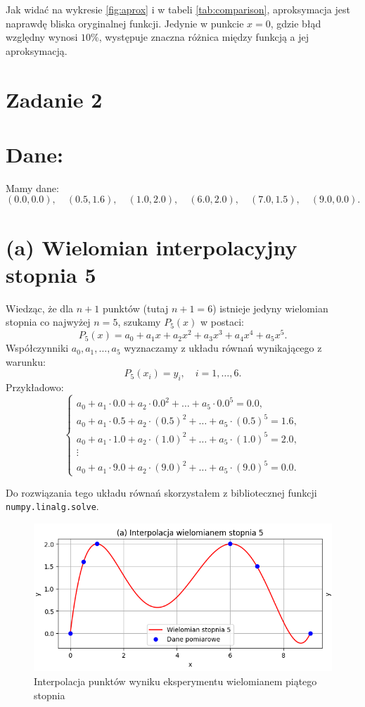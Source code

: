 \documentclass{article}
\begin{document}
Jak widać na wykresie \ref{fig:aprox} i w tabeli \ref{tab:comparison}, aproksymacja jest naprawdę bliska oryginalnej funkcji. Jedynie w punkcie $x = 0$, gdzie błąd względny wynosi $10 \%$, występuje znaczna różnica między funkcją a jej aproksymacją.

\section*{Zadanie 2}
\section*{Dane:}
Mamy dane: 
\[
(0.0,0.0),\quad (0.5,1.6),\quad (1.0,2.0),\quad (6.0,2.0),\quad (7.0,1.5),\quad (9.0,0.0).
\]

\section*{(a) Wielomian interpolacyjny stopnia 5}
Wiedząc, że dla \( n+1 \) punktów (tutaj \( n+1 = 6 \)) istnieje jedyny wielomian stopnia co najwyżej \( n=5 \), szukamy \( P_5(x) \) w postaci:
\[
P_5(x) = a_0 + a_1 x + a_2 x^2 + a_3 x^3 + a_4 x^4 + a_5 x^5.
\]
Współczynniki \( a_0, a_1, \ldots, a_5 \) wyznaczamy z układu równań wynikającego z warunku:
\[
P_5(x_i) = y_i,\quad i=1,\ldots,6.
\]
Przykładowo:
\[
\begin{cases}
a_0 + a_1\cdot 0.0 + a_2\cdot 0.0^2 + \dots + a_5\cdot 0.0^5 = 0.0,\\[1mm]
a_0 + a_1\cdot 0.5 + a_2\cdot (0.5)^2 + \dots + a_5\cdot (0.5)^5 = 1.6,\\[1mm]
a_0 + a_1\cdot 1.0 + a_2\cdot (1.0)^2 + \dots + a_5\cdot (1.0)^5 = 2.0,\\[1mm]
\vdots\\[1mm]
a_0 + a_1\cdot 9.0 + a_2\cdot (9.0)^2 + \dots + a_5\cdot (9.0)^5 = 0.0.
\end{cases}
\]

Do rozwiązania tego układu równań skorzystałem z bibliotecznej funkcji \texttt{numpy.linalg.solve}.

\begin{figure}[H]
    \centering
    \includegraphics[width=1\linewidth]{Interpolacja_Wielomian_5_stopnia.png}
    \caption{Interpolacja punktów wyniku eksperymentu wielomianem piątego stopnia}
    \label{fig:interpol_5}
\end{figure}
\end{document}

